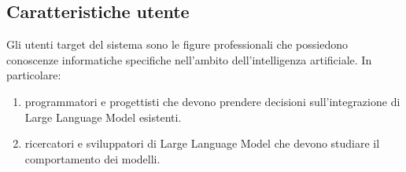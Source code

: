 
\subsection{Caratteristiche utente}
Gli utenti target del sistema sono le figure professionali che possiedono conoscenze informatiche specifiche nell'ambito dell'intelligenza artificiale.
In particolare:
\begin{enumerate}
    \item programmatori e progettisti che devono prendere decisioni sull'integrazione di Large Language Model esistenti.
    \item ricercatori e sviluppatori di Large Language Model che devono studiare il comportamento dei modelli.
\end{enumerate}  
